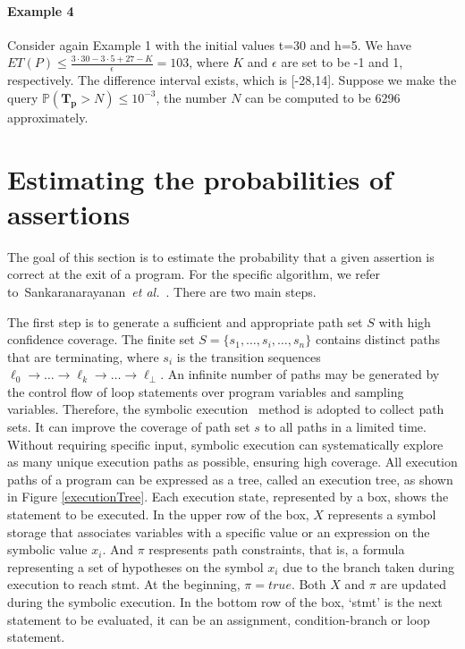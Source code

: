 \documentclass[runningheads]{llncs}
\begin{document}
\paragraph{Example 4} Consider again Example 1 with the initial values t=30 and h=5. We have  $ET(P) \leq \frac{3\cdot 30-3\cdot 5+27-K}{\epsilon}=103$, where $K$ and $\epsilon$ are set to be -1 and 1, respectively. The difference interval exists, which is [-28,14]. Suppose we make the query $\mathbb{P}(\bm{T_p} > N)\leq 10^{-3}$, the number $N$ can be computed to be 6296  approximately.

\section{Estimating the probabilities of assertions}
The goal of this section is to estimate the probability that a given assertion is correct at the exit of a program. For the specific algorithm, we refer to~Sankaranarayanan~\emph{et al.}~\cite{Sankaranarayanan2013Static}. There are two main steps.

The first step is to generate a sufficient and appropriate path set $S$ with high confidence coverage. The finite set $S=\{s_1,\dots,s_i,\dots,s_n\}$ contains distinct paths that are terminating, where $s_i$ is the transition sequences $\ell_0 \to \dots \to \ell_k \to \dots \to \ell_{\bot}$. An infinite number of paths may be generated by the control flow of loop statements over program variables and sampling variables. Therefore, the symbolic execution~\cite{Geldenhuys2012symbolic} method is adopted to collect path sets. It can improve the coverage of path set $s$ to all paths in a limited time. Without requiring specific input, symbolic execution can systematically explore as many unique execution paths as possible, ensuring high coverage. All execution paths of a program can be expressed as a tree, called an execution tree, as shown in Figure \ref{executionTree}. Each execution state, represented by a box, shows the statement to be executed. In the upper row of the box, $X$ represents a symbol storage that associates variables with a specific value or an expression on the symbolic value $x_i$. And $\pi$ respresents path constraints, that is, a formula representing a set of hypotheses on the symbol $x_i$ due to the branch taken during execution to reach stmt. At the beginning, $\pi=true$. Both $X$ and $\pi$ are updated during the symbolic execution. In the bottom row of the box, `stmt' is the next statement to be evaluated, it can be an assignment, condition-branch or loop statement.
\end{document}
